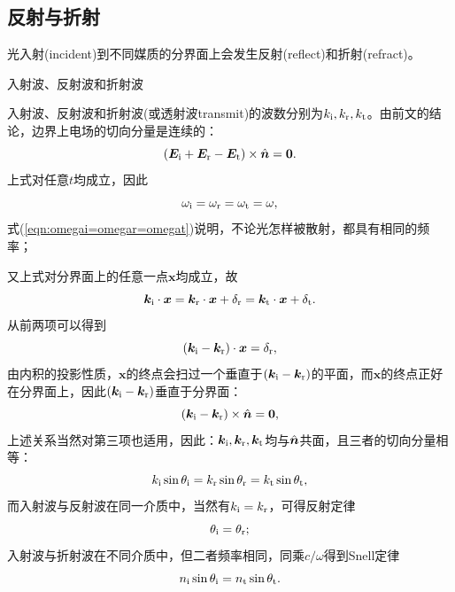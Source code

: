 \subsection{反射与折射}
光入射(incident)到不同媒质的分界面上会发生反射(reflect)和折射(refract)。
\begin{center}
	\tikzchap 入射波、反射波和折射波
\end{center}
入射波、反射波和折射波(或透射波transmit)的波数分别为$k_{\mathrm{i}},k_\text r,k_\text t$。由前文的结论，边界上电场的切向分量是连续的：
\[
    (\bm E_{\mathrm{i}}+\bm E_\text r-\bm E_\text t)\times\mathop{}\!\hat{\bm n}=\bm 0.
\]
上式对任意$t$均成立，因此
\begin{equation}
    \label{eqn:omegai=omegar=omegat}
    \omega_{\mathrm{i}}=\omega_\text r=\omega_\text t=\omega,
\end{equation}
式(\ref{eqn:omegai=omegar=omegat})说明，不论光怎样被散射，都具有相同的频率；

又上式对分界面上的任意一点$\bm x$均成立，故
\[
    \bm k_{\mathrm{i}}\cdot\bm x=\bm k_\text r\cdot\bm x+\delta_\text r=\bm k_\text t\cdot\bm x+\delta_\text t.
\]
从前两项可以得到
\[
    (\bm k_{\mathrm{i}}-\bm k_\text r)\cdot\bm x=\delta_\text r,
\]
由内积的投影性质，$\bm x$的终点会扫过一个垂直于$(\bm k_{\mathrm{i}}-\bm k_\text r)$的平面，而$\bm x$的终点正好在分界面上，因此$(\bm k_{\mathrm{i}}-\bm k_\text r)$垂直于分界面：
\[
    (\bm k_{\mathrm{i}}-\bm k_\text r)\times\mathop{}\!\hat{\bm n}=\bm 0,
\]
上述关系当然对第三项也适用，因此：$\bm k_{\mathrm{i}},\bm k_\text r,\bm k_\text t$均与$\mathop{}\!\hat{\bm n}$共面，且三者的切向分量相等：
\begin{equation}
    k_{\mathrm{i}}\sin\theta_{\mathrm{i}}=k_\text r\sin\theta_\text r=k_\text t\sin\theta_\text t,
\end{equation}
而入射波与反射波在同一介质中，当然有$k_{\mathrm{i}}=k_\text r$，可得反射定律
\begin{equation}
    \theta_{\mathrm{i}}=\theta_\text r;
\end{equation}
入射波与折射波在不同介质中，但二者频率相同，同乘$c/\omega$得到Snell定律
\begin{equation}
    \label{eqn:Snell}
    n_{\mathrm{i}}\sin\theta_{\mathrm{i}}=n_\text t\sin\theta_\text t.
\end{equation}
